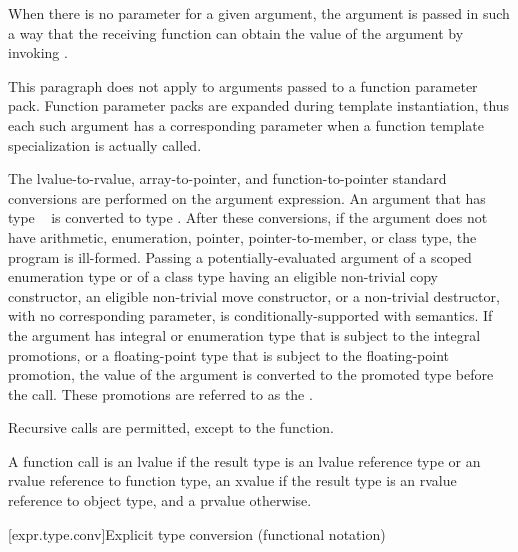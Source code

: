 \pnum
{}%
When there is no parameter for a given argument, the argument is passed
in such a way that the receiving function can obtain the value of the
argument by invoking .
\begin{note}
This paragraph does not apply to arguments passed to a function parameter pack.
Function parameter packs are expanded during template instantiation,
thus each such argument has a corresponding parameter when a function template
specialization is actually called.
\end{note}
The
lvalue-to-rvalue, array-to-pointer,
and function-to-pointer standard conversions are
performed on the argument expression.
An argument that has type \cv{}~ is converted
to type .
After these conversions, if the
argument does not have arithmetic, enumeration, pointer, pointer-to-member,
or class type, the program is ill-formed.
Passing a potentially-evaluated argument
of a scoped enumeration type or
of a class type having
an eligible non-trivial copy constructor,
an eligible non-trivial move constructor, or
a non-trivial destructor,
with no corresponding parameter, is conditionally-supported with
 semantics. If the argument has
integral or enumeration type that is subject to the integral
promotions, or a floating-point type that is subject to the
floating-point promotion, the value of the argument is converted to the
promoted type before the call. These promotions are referred to as
the .

\pnum
{}%
Recursive calls are permitted, except to the 
function.

\pnum
A function call is an lvalue
if the result type is an lvalue reference type or an rvalue reference to function type,
an xvalue if the result type is an rvalue reference to object type, and a prvalue
otherwise.

[expr.type.conv]{Explicit type conversion (functional notation)}

